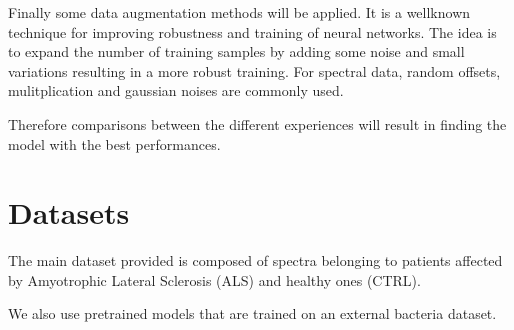 Finally some data augmentation methods will be applied. It is a wellknown technique for improving robustness and training of neural networks. The idea is to expand the number of training samples by adding some noise and small variations resulting in a more robust training. For spectral data, random offsets, mulitplication and gaussian noises are commonly used.

Therefore comparisons between the different experiences will result in finding the model with the best performances.



\section{Datasets}

The main dataset provided is composed of spectra belonging to patients affected by Amyotrophic Lateral Sclerosis (ALS) and healthy ones (CTRL).

We also use pretrained models that are trained on an external bacteria dataset.

